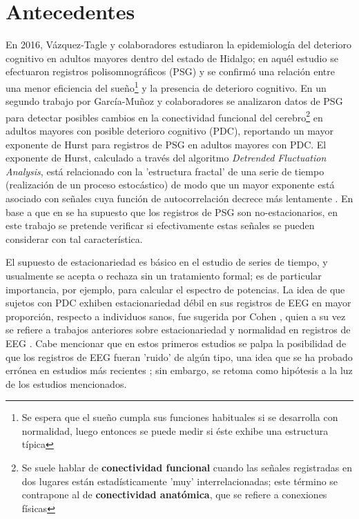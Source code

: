 \documentclass[12pt,a4paper]{mitthesis}
\begin{document}
\setcounter{page}{1}

\chapter{Antecedentes}

En 2016, V\'azquez-Tagle y colaboradores \cite{VazquezTagle16} estudiaron la epidemiolog\'ia del 
deterioro cognitivo en adultos mayores dentro del estado de Hidalgo; en aqu\'el estudio se 
efectuaron registros polisomnogr\'aficos (PSG) y se confirm\'o una relaci\'on entre una menor 
eficiencia del sue\~no\footnote{Se espera que el sue\~no cumpla sus funciones habituales si se 
desarrolla con normalidad, luego entonces se puede medir si \'este exhibe una estructura t\'ipica} 
y la presencia de deterioro cognitivo.
En un segundo trabajo por Garc\'ia-Mu\~noz y colaboradores \cite{Valeria} se analizaron datos de 
PSG para detectar posibles cambios en la conectividad funcional del cerebro\footnote{Se suele 
hablar de \textbf{conectividad funcional} cuando las se\~nales registradas en dos lugares est\'an 
estad\'isticamente 'muy' interrelacionadas; este t\'ermino se contrapone al de \textbf{conectividad 
anat\'omica}, que se refiere a conexiones f\'isicas} en adultos mayores con posible deterioro 
cognitivo (PDC), reportando un mayor exponente de Hurst para registros de PSG en adultos mayores 
con PDC.
El exponente de Hurst, calculado a trav\'es del algoritmo \textit{Detrended Fluctuation Analysis}, 
est\'a relacionado con la 'estructura fractal' de una serie de tiempo (realizaci\'on de un proceso 
estoc\'astico) de modo que un mayor exponente est\'a asociado con se\~nales cuya funci\'on de 
autocorrelaci\'on decrece m\'as lentamente \cite{Rodriguez11}.
En base a que en \cite{Valeria} se ha supuesto que los registros de PSG son no-estacionarios, en 
este trabajo se pretende verificar si efectivamente estas se\~nales se pueden considerar con tal
caracter\'istica.

El supuesto de estacionariedad es b\'asico en el estudio de series de tiempo, y usualmente se 
acepta o rechaza sin un tratamiento formal; es de particular importancia, por ejemplo, para 
calcular el espectro de potencias.
La idea de que sujetos con PDC exhiben estacionariedad d\'ebil en sus registros de EEG en mayor 
proporci\'on, respecto a individuos sanos, fue sugerida por Cohen \cite{Cohen77}, quien a su vez se 
refiere a trabajos anteriores sobre estacionariedad y normalidad en registros de EEG 
\cite{McEwen75,Sugimoto78,Kawabata73}.
Cabe mencionar que en estos primeros estudios se palpa la posibilidad de que los registros de EEG 
fueran 'ruido' de alg\'un tipo, una idea que se ha probado err\'onea en estudios m\'as recientes 
\cite{Klonowski09}; sin embargo, se retoma como hip\'otesis a la luz de los estudios mencionados. 
\end{document}
